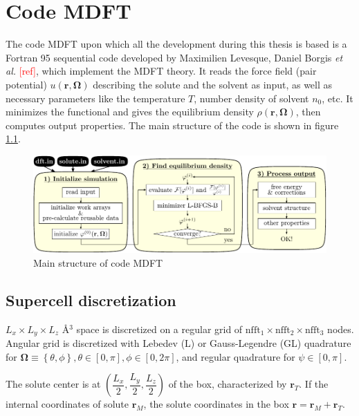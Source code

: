 
\chapter{Code MDFT\label{chpt:mdft}}

The code MDFT upon which all the development during this thesis is based is a Fortran 95 sequential code developed by Maximilien Levesque,
Daniel Borgis \textit{et al.} \textcolor{red}{{[}ref{]}}, which implement
the \acs{MDFT} theory. It reads the force field (pair potential)
$u(\mathbf{r},\mathbf{\Omega})$ describing the solute and the solvent
as input, as well as necessary parameters like the temperature $T$,
number density of solvent $n_{0}$, etc. It minimizes the functional
and gives the equilibrium density $\rho(\mathbf{r},\mathbf{\Omega})$,
then computes output properties. The main structure of the code is
shown in figure \ref{fig:code-mdft}.

\begin{figure}[h]
\begin{centering}
\includegraphics[width=1\columnwidth]{_figure/mdft}
\par\end{centering}
\caption{Main structure of code MDFT\label{fig:code-mdft}}
\end{figure}


\section{Supercell discretization}

$L_{x}\times L_{y}\times L_{z}$ Å$^{3}$ space is discretized on
a regular grid of $\textrm{nfft}_{1}\times\textrm{nfft}_{2}\times\textrm{nfft}_{3}$
nodes. Angular grid is discretized with Lebedev (L) or Gauss-Legendre
(GL) quadrature for $\bm{\Omega}\equiv\left\{ \theta,\phi\right\},\theta\in\left[0,\pi\right],\phi\in\left[0,2\pi\right]$,
and regular quadrature for $\psi\in\left[0,\pi\right]$.

The solute center is at $\left(\dfrac{L_{x}}{2},\dfrac{L_{y}}{2},\dfrac{L_{z}}{2}\right)$
of the box, characterized by $\mathbf{r}_{T}$. If the internal coordinates
of solute $\mathbf{r}_{M}$, the solute coordinates in the box $\mathbf{r}=\mathbf{r}_{M}+\mathbf{r}_{T}$.

